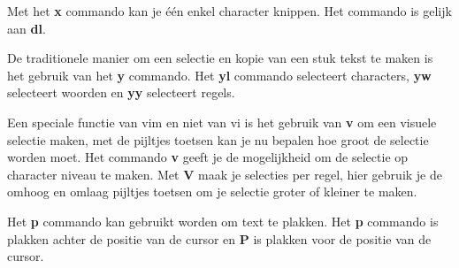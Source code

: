 Met het \textbf{x} commando kan je \'e\'en enkel character knippen. Het commando is gelijk aan \textbf{dl}.

De traditionele manier om een selectie en kopie van een stuk tekst te maken is het gebruik van het \textbf{y} commando. Het \textbf{yl} commando selecteert characters, \textbf{yw} selecteert woorden en \textbf{yy} selecteert regels.

Een speciale functie van vim en niet van vi is het gebruik van \textbf{v} om een visuele selectie maken, met de pijltjes toetsen kan je nu bepalen hoe groot de selectie worden moet. Het commando \textbf{v} geeft je de mogelijkheid om de selectie op character niveau te maken. Met \textbf{V} maak je selecties per regel, hier gebruik je de omhoog en omlaag pijltjes toetsen om je selectie groter of kleiner te maken.

Het \textbf{p} commando kan gebruikt worden om text te plakken. Het \textbf{p} commando is plakken achter de positie van de cursor en \textbf{P} is plakken voor de positie van de cursor.
